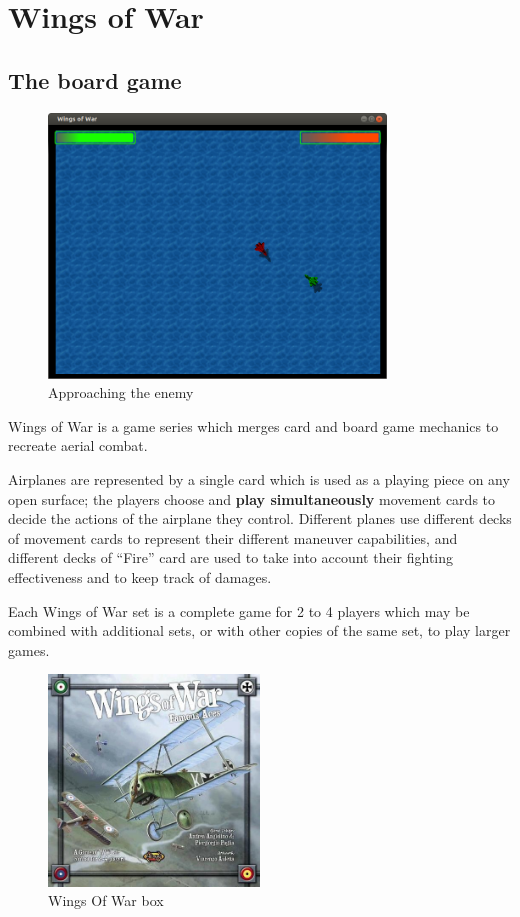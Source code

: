 
\chapter{Wings of War}

\section{The board game}
\begin{figure}
  \centering
      \includegraphics[width=0.8\textwidth]{images/1.png}
  \caption{Approaching the enemy}
\end{figure}
Wings of War is a game series which merges card and board game mechanics to recreate aerial combat.

Airplanes are represented by a single card which is used as a playing piece on any open surface; the players choose and \textbf{play simultaneously} movement cards to decide the actions of the airplane they control. Different planes use different decks of movement cards to represent their different maneuver capabilities, and different decks of ``Fire'' card are used to take into account their fighting effectiveness and to keep track of damages.

Each Wings of War set is a complete game for 2 to 4 players which may be combined with additional sets, or with other copies of the same set, to play larger games.

\begin{figure}
  \centering
      \includegraphics[width=0.5\textwidth]{images/wow.jpg}
  \caption{Wings Of War box}
\end{figure}

